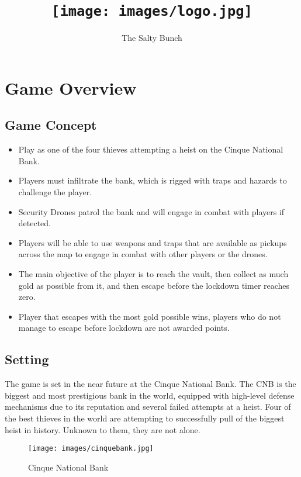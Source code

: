 \documentclass[11pt]{report}
\title{\texttt{[image: images/logo.jpg]}}
\author{The Salty Bunch}
\begin{document}
\maketitle
\tableofcontents

\chapter{Game Overview}

\section{Game Concept}

\begin{itemize}
    \item Play as one of the four thieves attempting a heist on the Cinque National Bank.
    \item Players must infiltrate the bank, which is rigged with traps and hazards to challenge the player.
    \item Security Drones patrol the bank and will engage in combat with players if detected.
    \item Players will be able to use weapons and traps that are available as pickups across the map to engage in combat with other players or the drones.
    \item The main objective of the player is to reach the vault, then collect as much gold as possible from it, and then escape before the lockdown timer reaches zero.
    \item Player that escapes with the most gold possible wins, players who do not manage to escape before lockdown are not awarded points.
\end{itemize}

\section{Setting}

The game is set in the near future at the Cinque National Bank. The CNB is the biggest and most prestigious bank in the world, equipped with high-level defense mechanisms due to its reputation and several failed attempts at a heist. Four of the best thieves in the world are attempting to successfully pull of the biggest heist in history. Unknown to them, they are not alone.

\begin{figure}[H]
    \centering
    \texttt{[image: images/cinquebank.jpg]}
    \caption{Cinque National Bank}
\end{figure}
\end{document}
